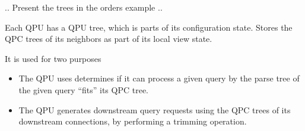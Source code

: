 .. Present the trees in the orders example ..

Each QPU has a QPU tree, which is parts of its configuration state.
Stores the QPC trees of its neighbors as part of its local view state.

It is used for two purposes
\begin{itemize}
  \item The QPU uses determines if it can process a given query by the parse tree of the given query ``fits'' its QPC tree.
  \item The QPU generates downstream query requests using the QPC trees of its downstream connections, by performing a
  trimming operation.
\end{itemize}














